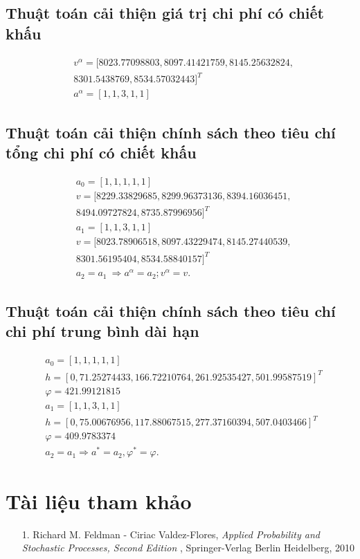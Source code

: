 \documentclass[12pt,a4paper]{report}
\begin{document}
	\section{Thuật toán cải thiện giá trị chi phí có chiết khấu}
	
	\begin{align*}
	&v^\alpha=[8023.77098803, 8097.41421759, 8145.25632824,\\ &8301.5438769,  8534.57032443]^T\\
	&a^\alpha=[1, 1 ,3 ,1, 1]
	\end{align*}

	
	\section{Thuật toán cải thiện chính sách theo tiêu chí tổng chi phí có chiết khấu}
	
	\begin{align*}
	&a_0=[1, 1, 1, 1, 1]\\
	&v=[8229.33829685, 8299.96373136, 8394.16036451,\\ &8494.09727824, 8735.87996956]^T\\
	&a_1=[1, 1, 3, 1, 1]\\
	&v=[8023.78906518, 8097.43229474, 8145.27440539,\\ &8301.56195404, 8534.58840157]^T\\
	&a_2=a_1 \ \Rightarrow a^\alpha=a_2; v^\alpha=v.
	\end{align*}

	\section{Thuật toán cải thiện chính sách theo tiêu chí chi phí trung bình dài hạn} 
	\begin{align*}
	&a_0=[1, 1, 1, 1, 1]\\
	&h=[  0     ,    71.25274433 ,166.72210764 ,261.92535427, 501.99587519]^T\\
	&\varphi=421.99121815\\
	&a_1=[1, 1, 3, 1, 1]\\
	&h=[  0        , 75.00676956 ,117.88067515 ,277.37160394, 507.0403466]^T\\
	&\varphi=409.9783374\\
	&a_2=a_1 \Rightarrow a^*=a_2, \varphi^*=\varphi.
	\end{align*}
	\chapter{Tài liệu tham khảo}
	\begin{itemize}
		\item[1.] Richard M. Feldman - Ciriac Valdez-Flores, \textit{Applied Probability and Stochastic Processes, Second Edition} , Springer-Verlag Berlin Heidelberg, 2010
	\end{itemize}
	
\end{document}
